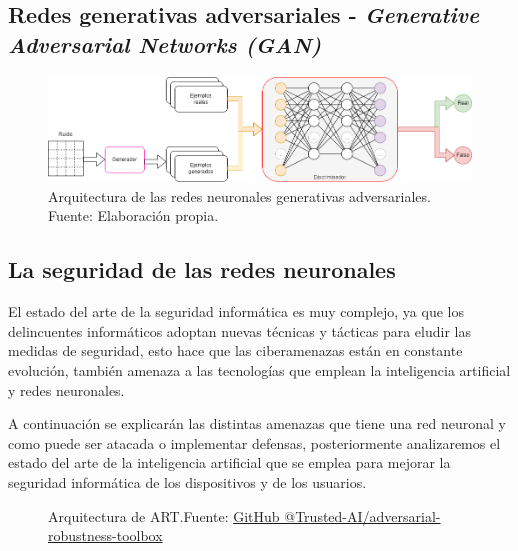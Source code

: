\subsection{Redes generativas adversariales - \textit{Generative Adversarial Networks (GAN)}}
\begin{figure}[H]
  \centering
  \includegraphics[width=1\textwidth]{figures/chapter02/GANs.drawio.png}
  \caption{Arquitectura de las redes neuronales generativas adversariales.\\Fuente: Elaboración propia.}
  \label{fig:gans-architecture}
\end{figure}



\subsection{La seguridad de las redes neuronales}
\label{ch:2:section:state-of-the-art:computer-security-in-neural-networks}


El estado del arte de la seguridad informática es muy complejo, ya que los delincuentes informáticos adoptan nuevas técnicas y tácticas para eludir las medidas de seguridad, esto hace que las ciberamenazas están en constante evolución, también amenaza a las tecnologías que emplean la inteligencia artificial y redes neuronales.

A continuación se explicarán las distintas amenazas que tiene una red neuronal y como puede ser atacada o implementar defensas, posteriormente analizaremos el estado del arte de la inteligencia artificial que se emplea para mejorar la seguridad informática de los dispositivos y de los usuarios.

\begin{figure}[H]
  \centering
  \centerline{}
  \caption{Arquitectura de ART.\newline{}Fuente: \href{https://github.com/Trusted-AI/adversarial-robustness-toolbox/wiki/ART-Architecture-and-Roadmap}{GitHub @Trusted-AI/adversarial-robustness-toolbox}}
  \label{fig:art-architecture}
\end{figure}

